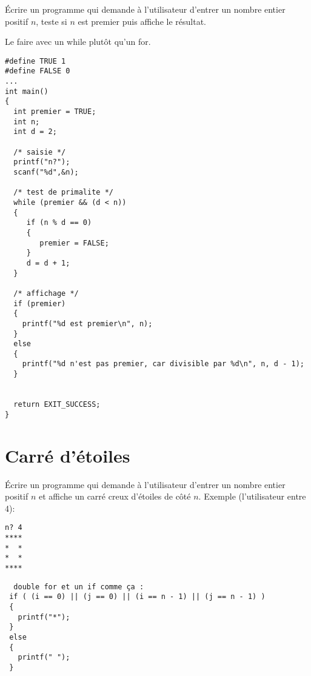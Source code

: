 Écrire un programme qui demande à l'utilisateur d'entrer un
nombre entier positif $n$, teste si $n$ est premier puis affiche le
résultat. 

\begin{correction}
Le faire avec un while plutôt qu'un for.
\begin{verbatim}
#define TRUE 1
#define FALSE 0
...
int main()
{
  int premier = TRUE;
  int n;
  int d = 2;
 
  /* saisie */
  printf("n?");
  scanf("%d",&n);

  /* test de primalite */
  while (premier && (d < n))
  {
     if (n % d == 0)
     {
        premier = FALSE;
     }
     d = d + 1;
  }

  /* affichage */
  if (premier)
  {
    printf("%d est premier\n", n);
  }
  else
  {
    printf("%d n'est pas premier, car divisible par %d\n", n, d - 1);
  }


  return EXIT_SUCCESS;
}
\end{verbatim}
\end{correction}

\section{Carré d'étoiles}

Écrire un programme qui demande à l'utilisateur d'entrer un nombre
entier positif $n$ et affiche un carré creux d'étoiles de côté $n$.
Exemple (l'utilisateur entre 4):
\begin{verbatim}
n? 4
****
*  *
*  *
****
\end{verbatim}

\begin{correction}
\begin{verbatim}
  double for et un if comme ça :
 if ( (i == 0) || (j == 0) || (i == n - 1) || (j == n - 1) )
 {
   printf("*");
 }
 else
 {
   printf(" ");
 }
\end{verbatim}
\end{correction}
